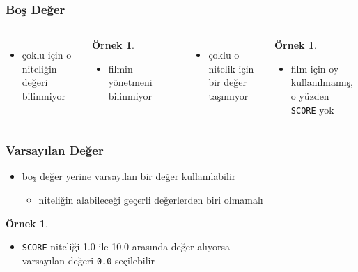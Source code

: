 \documentclass[dvipsnames]{beamer}
\theoremstyle{definition}
\theoremstyle{example}
\newtheorem{ornek}[theorem]{Örnek}
\theoremstyle{plain}
\begin{document}
\begin{frame}
  \frametitle{Boş Değer}

  \begin{columns}[t]
    \begin{itemize}
      \item çoklu için o niteliğin\\
	değeri bilinmiyor
    \end{itemize}

    \begin{ornek}
      \begin{itemize}
        \item filmin yönetmeni bilinmiyor
      \end{itemize}
    \end{ornek}

    \pause
    \begin{itemize}
      \item çoklu o nitelik için\\
	bir değer taşımıyor
    \end{itemize}

    \begin{ornek}
      \begin{itemize}
        \item film için oy kullanılmamış,\\
          o yüzden \texttt{SCORE} yok
      \end{itemize}
    \end{ornek}
  \end{columns}
\end{frame}

\begin{frame}
  \frametitle{Varsayılan Değer}

  \begin{itemize}
    \item boş değer yerine varsayılan bir değer kullanılabilir
    \begin{itemize}
      \item niteliğin alabileceği geçerli değerlerden biri olmamalı
    \end{itemize}
  \end{itemize}

  \pause
  \begin{ornek}
    \begin{itemize}
      \item \texttt{SCORE} niteliği 1.0 ile 10.0 arasında değer alıyorsa\\
	varsayılan değeri \texttt{0.0} seçilebilir
    \end{itemize}
  \end{ornek}
\end{frame}
\end{document}
